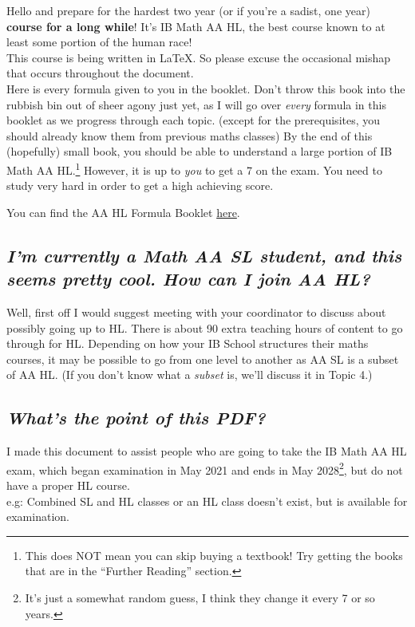 \documentclass[main.tex]{subfiles}
\begin{document}
\hbox{} Hello and prepare for the hardest two year (or if you're a sadist, one year) \textbf{course for a long while}! It's IB Math AA HL, the best course known to at least some portion of the human race!\\ This course is being written in \LaTeX. So please excuse the occasional mishap that occurs throughout the document.\\
Here is every formula given to you in the booklet. Don't throw this book into the rubbish bin out of sheer agony just yet, as I will go over \textsl{every} formula in this booklet as we progress through each topic. (except for the prerequisites, you should already know them from previous maths classes) By the end of this (hopefully) small book, you should be able to understand a large portion of IB Math AA HL.\footnote{This does NOT mean you can skip buying a textbook! Try getting the books that are in the ``Further Reading'' section.} However, it is up to \textsl{you} to get a 7 on the exam. You need to study very hard in order to get a high achieving score.\\

\begin{center}
 You can find the AA HL Formula Booklet \href{https://bit.ly/maaformulabooklet}{here}.\\
\end{center}
\subsection*{\textsl{I'm currently a Math AA SL student, and this seems pretty cool. How can I join AA HL?}}

Well, first off I would suggest meeting with your coordinator to discuss about possibly going up to HL. There is about 90 extra teaching hours of content to go through for HL. Depending on how your IB School structures their maths courses, it may be possible to go from one level to another as AA SL is a subset of AA HL. (If you don't know what a \textsl{subset} is, we'll discuss it in Topic 4.) 

\subsection*{\textsl{What's the point of this PDF?}}

I made this document to assist people who are going to take the IB Math AA HL exam, which began examination in May 2021 and ends in May 2028\footnote{It's just a somewhat random guess, I think they change it every 7 or so years.}, but do not have a proper HL course.\\
e.g:  Combined SL and HL classes or an HL class doesn't exist, but is available for examination.
\newpage
\end{document}
